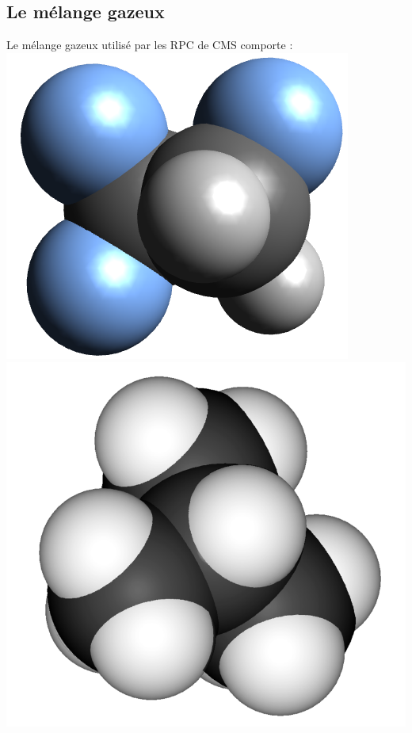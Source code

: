 \subsection{Le mélange gazeux}
Le mélange gazeux utilisé par les RPC de CMS comporte :
\marginpar
{
	\centering
	\includegraphics[width=\marginparwidth]{RPC/C2H2F4.png}
	\label{Tetra}
}
\marginpar
{
	\centering
	\includegraphics[width=\marginparwidth]{RPC/Isobutane.png}
	\label{Iso}
}
